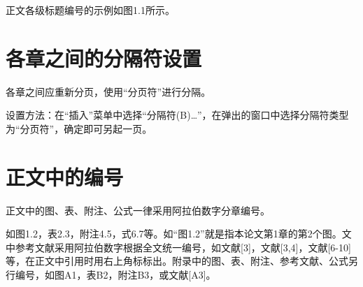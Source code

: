 正文各级标题编号的示例如图1.1所示。

\section{各章之间的分隔符设置}
各章之间应重新分页，使用“分页符”进行分隔。

设置方法：在“插入”菜单中选择“分隔符(B)…”，在弹出的窗口中选择分隔符类型为“分页符”，确定即可另起一页。

\section{正文中的编号}
正文中的图、表、附注、公式一律采用阿拉伯数字分章编号。

如图1.2，表2.3，附注4.5，式6.7等。如“图1.2”就是指本论文第1章的第2个图。文中参考文献采用阿拉伯数字根据全文统一编号，如文献[3]，文献[3,4]，文献[6-10]等，在正文中引用时用右上角标标出。附录中的图、表、附注、参考文献、公式另行编号，如图A1，表B2，附注B3，或文献[A3]。


